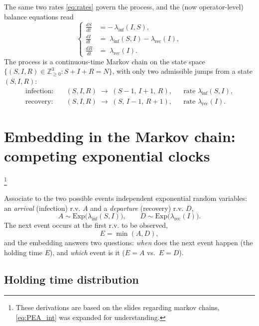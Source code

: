 The same two rates \eqref{eq:rates} govern the process, and the (now
operator-level) balance equations read
\begin{equation}
  \left\{
  \begin{aligned}
    \frac{dS}{dt} &= -\,\lambda_{\mathrm{inf}}(I,S),\\[2pt]
    \frac{dI}{dt} &= \;\lambda_{\mathrm{inf}}(S,I) - \lambda_{\mathrm{rec}}(I),\\[2pt]
    \frac{dR}{dt} &= \;\lambda_{\mathrm{rec}}(I).
  \end{aligned}
  \right.
  \label{eq:stoch_balance}
\end{equation}
The process is a continuous-time Markov chain on the state space
$\{(S,I,R)\in\mathbb{Z}_{\ge 0}^3 : S+I+R=N\}$, with only two admissible
jumps from a state $(S,I,R)$:
\begin{align}
  \text{infection:} &\quad (S,I,R)\;\longrightarrow\;(S-1,\,I+1,\,R),
    && \text{rate } \lambda_{\mathrm{inf}}(S,I),\\
  \text{recovery:}  &\quad (S,I,R)\;\longrightarrow\;(S,\,I-1,\,R+1),
    && \text{rate } \lambda_{\mathrm{rec}}(I).
\end{align}

\section{Embedding in the Markov chain: competing exponential clocks}
\label{sec:embed}
\footnote{These derivations are based on the slides regarding markov chains, \eqref{eq:PEA_int} was expanded for understanding.}

Associate to the two possible events independent exponential random variables: an
\emph{arrival} (infection) r.v. $A$ and a \emph{departure} (recovery) r.v.
$D$,
\begin{equation}
  A \sim \mathrm{Exp}\!\big(\lambda_{\mathrm{inf}}(S,I)\big),
  \qquad
  D \sim \mathrm{Exp}\!\big(\lambda_{\mathrm{rec}}(I)\big).
\end{equation}
The next event occurs at the first r.v. to be observed,
\begin{equation}
  E = \min(A,D),
\end{equation}
and the embedding answers two questions: \emph{when} does the next event
happen (the holding time $E$), and \emph{which} event is it ($E=A$ vs.\ $E=D$).

\subsection{Holding time distribution}

